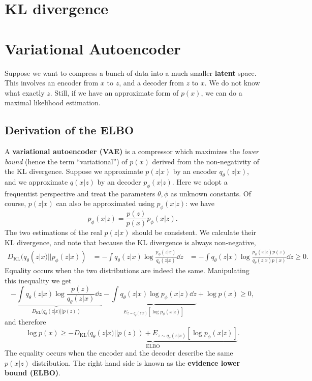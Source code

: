 \documentclass[hyperref, a4paper, 12pt]{report}
\newcommand*{\concept}[1]{{\textbf{#1}}}
\def\\{}%
\def\mathbb#1{#1}%
\begin{document}
\section{KL divergence}

\section{Variational Autoencoder}

Suppose we want to compress a bunch of data into a much smaller \concept{latent} space.
This involves an encoder from $x$ to $z$, and a decoder from $z$ to $x$.
We do not know what exactly $z$.
Still, if we have an approximate form of $p(x)$,
we can do a maximal likelihood estimation.

\subsection{Derivation of the ELBO}

A \concept{variational autoencoder (VAE)} is a compressor which maximizes the \emph{lower bound}
(hence the term ``variational'') of $p(x)$ derived from the non-negativity of the KL divergence.
Suppose we approximate $p(z|x)$ by an encoder $q_\theta(z | x)$,
and we approximate $q(x|z)$ by an decoder $p_\phi(x | z)$.
Here we adopt a frequentist perspective and treat the parameters $\theta, \phi$ as unknown constants.
Of course, $p(z | x)$ can also be approximated using $p_\phi(x | z)$: we have 
\begin{equation}
    p_\phi(x | z) = \frac{p(z)}{p(x)} p_\phi(x | z).
\end{equation}
The two estimations of the real $p(z | x)$ should be consistent.
We calculate their KL divergence, and note that because the KL divergence is always non-negative,
\begin{equation}
    \begin{aligned}
        D_{\text{KL}}(q_\theta(z|x) || p_\phi(z|x)) &= - \int q_\theta(z|x) \log \frac{p_\phi(z|x)}{q_\theta(z|x)} \dd{z} \\
        &= - \int q_\theta(z|x) \log \frac{p_\phi(x|z) p(z)}{q_\theta(z|x) p(x)} \dd{z} \geq 0.
    \end{aligned}
\end{equation} 
Equality occurs when the two distributions are indeed the same.
Manipulating this inequality we get 
\[
    \underbrace{- \int q_\theta(z|x) \log \frac{p(z)}{q_\theta(z|x)} \dd{z}}_{D_{\text{KL}}(q_\theta(z|x) ||p(z))} - \underbrace{\int q_\theta(z|x)  \log p_\phi(x|z) \dd{z}}_{\mathbb{E}_{z\sim q_\theta(z|x)}[\log p_\phi(x|z)]} + \log p(x) \geq 0,
\]
and therefore 
\begin{equation}
    \log p(x) \geq \underbrace{- D_{\text{KL}}(q_\theta(z|x) ||p(z)) + \mathbb{E}_{z\sim q_\theta(z|x)}[\log p_\phi(x|z)]}_{\text{ELBO}}.
    \label{eq:loss.vae.gaussian.elbo}
\end{equation}
The equality occurs when the encoder and the decoder describe the same $p(x|z)$ distribution.
The right hand side is known as the \concept{evidence lower bound (ELBO)}.
\end{document}
